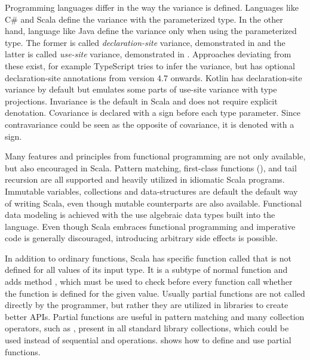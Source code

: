 

Programming languages differ in the way the variance is defined. Languages like C\# and Scala define the variance with the parameterized type. In the other hand, language like Java define the variance only when using the parameterized type. The former is called \textit{declaration-site} variance, demonstrated in  and the latter is called \textit{use-site} variance, demonstrated in . Approaches deviating from these exist, for example TypeScript tries to infer the variance, but has optional declaration-site annotations from version 4.7 onwards. Kotlin has declaration-site variance by default but emulates some parts of use-site variance with type projections. Invariance is the default in Scala and does not require explicit denotation. Covariance is declared with a \inlinecode{+} sign before each type parameter. Since contravariance could be seen as the opposite of covariance, it is denoted with a \inlinecode{-} sign.





Many features and principles from functional programming are not only available, but also encouraged in Scala. Pattern matching, first-class functions (), and tail recursion are all supported and heavily utilized in idiomatic Scala programs. Immutable variables, collections and data-structures are default the default way of writing Scala, even though mutable counterparts are also available. Functional data modeling is achieved with the use algebraic data types built into the language. Even though Scala embraces functional programming and imperative code is generally discouraged, introducing arbitrary side effects is possible.



In addition to ordinary functions, Scala has specific function called  that is not defined for all values of its input type. It is a subtype of normal function and adds method , which must be used to check before every function call whether the function is defined for the given value. Usually partial functions are not called directly by the programmer, but rather they are utilized in libraries to create better APIs. Partial functions are useful in pattern matching and many collection operators, such as , present in all standard library collections, which could be used instead of sequential  and  operations.  shows how to define and use partial functions.

